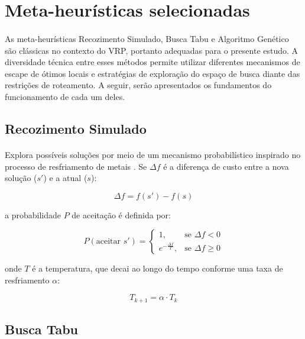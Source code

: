 \section{Meta-heurísticas selecionadas}
\label{sec:selecao_meta}

\paragraph{}As meta-heurísticas Recozimento Simulado, Busca Tabu e Algoritmo Genético são clássicas no contexto do VRP, portanto adequadas para o presente estudo. A diversidade técnica entre esses métodos permite utilizar diferentes mecanismos de escape de ótimos locais e estratégias de exploração do espaço de busca diante das restrições de roteamento. A seguir, serão apresentados os fundamentos do funcionamento de cada um deles.

\subsection{Recozimento Simulado}
\label{sec:sa}

\paragraph{} Explora possíveis soluções por meio de um mecanismo probabilístico inspirado no processo de resfriamento de metais \cite{Kirkpatrick83}. Se $\Delta f$ é a diferença de custo entre a nova solução ($s'$) e a atual ($s$):

$$\Delta f = f(s') - f(s)$$

\vspace{0.5cm}
\noindent a probabilidade $P$ de aceitação é definida por:

$$P(\text{aceitar } s') = 
\begin{cases} 
1, & \text{se } \Delta f < 0 \\
e^{-\frac{\Delta f}{T}}, & \text{se } \Delta f \geq 0 
\end{cases}$$

\vspace{0.5cm}
\noindent onde $T$ é a temperatura, que decai ao longo do tempo conforme uma taxa de resfriamento $\alpha$:

$$T_{k+1} = \alpha \cdot T_k$$

\subsection{Busca Tabu}
\label{sec:ts}

